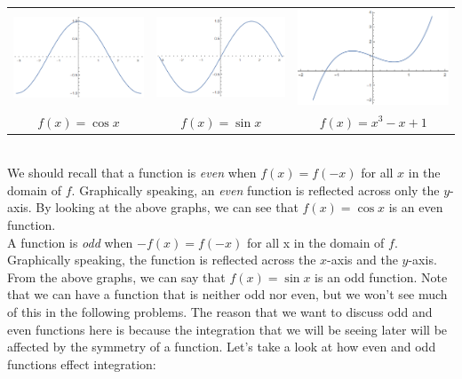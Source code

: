 \documentclass{article}
\begin{document}
\begin{center}
\begin{tabular}{c c c}
\includegraphics[scale=0.4]{cos_eo} & \includegraphics[scale=0.4]{sin_eo} & \includegraphics[scale=0.4]{cube_eo}\\
$f(x) = \cos{x}$ & $f(x) = \sin{x}$ & $f(x) = x^{3}-x +1$
\end{tabular}
\end{center}
\noindent\\
\indent We should recall that a function is \textit{even} when $f(x) = f(-x)$ for all $x$ in the domain of $f$. Graphically speaking, an \textit{even} function is reflected across only the $y$-axis. By looking at the above graphs, we can see that $f(x) = \cos{x}$ is an even function.\\
\indent A function is \textit{odd} when $-f(x) = f(-x)$ for all x in the domain of $f$. Graphically speaking, the function is reflected across the $x$-axis and the $y$-axis. From the above graphs, we can say that $f(x) = \sin{x}$ is an odd function. Note that we can have a function that is neither odd nor even, but we won't see much of this in the following problems. The reason that we want to discuss odd and even functions here is because the integration that we will be seeing later will be affected by the symmetry of a function. Let's take a look at how even and odd functions effect integration:\\\\
\end{document}
